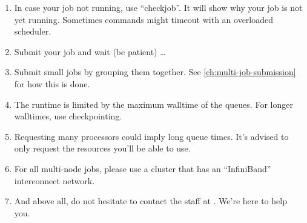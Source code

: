 \begin{enumerate}
  \ifgent
  \else
  \ifbrussel
  \else
  \item  In case your job not running, use ``checkjob''.  It will show why your
    job is not yet running. Sometimes commands might timeout with an overloaded
    scheduler.
  \fi
  \fi

  \item  Submit your job and wait (be patient) \ldots

  \item  Submit small jobs by grouping them together. See \autoref{ch:multi-job-submission}
    for how this is done.

  \item  The runtime is limited by the maximum walltime of the queues. For
    longer walltimes, use checkpointing.

  \item  Requesting many processors could imply long queue times. It's advised
    to only request the resources you'll be able to use.

  \item  For all multi-node jobs, please use a cluster that has an ``InfiniBand''
    interconnect network.

  \item  And above all, do not hesitate to contact the \hpc staff at \hpcinfo. We're
    here to help you.
\end{enumerate}
